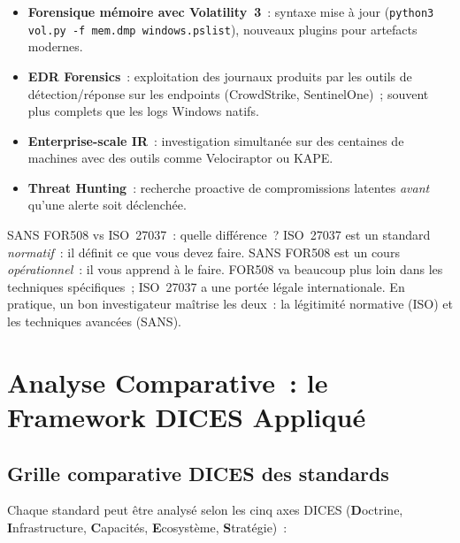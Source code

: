 \begin{itemize}
    \item \textbf{Forensique mémoire avec Volatility~3}~: syntaxe mise à
          jour (\texttt{python3 vol.py -f mem.dmp windows.pslist}),
          nouveaux plugins pour artefacts modernes.
    \item \textbf{EDR Forensics}~: exploitation des journaux produits par les
          outils de détection/réponse sur les endpoints (CrowdStrike, SentinelOne)~;
          souvent plus complets que les logs Windows natifs.
    \item \textbf{Enterprise-scale IR}~: investigation simultanée sur
          des centaines de machines avec des outils comme Velociraptor ou KAPE.
    \item \textbf{Threat Hunting}~: recherche proactive de compromissions
          latentes \emph{avant} qu'une alerte soit déclenchée.
\end{itemize}

\begin{boiteRemarque}{SANS FOR508 vs ISO~27037~: quelle différence~?}
ISO~27037 est un standard \emph{normatif}~: il définit ce que vous devez faire.
SANS FOR508 est un cours \emph{opérationnel}~: il vous apprend à le faire.
FOR508 va beaucoup plus loin dans les techniques spécifiques~; ISO~27037 a
une portée légale internationale. En pratique, un bon investigateur maîtrise
les deux~: la légitimité normative (ISO) et les techniques avancées (SANS).
\end{boiteRemarque}

\section{Analyse Comparative~: le Framework DICES Appliqué}
\label{sec:comparaison-dices}

\subsection{Grille comparative DICES des standards}

Chaque standard peut être analysé selon les cinq axes DICES
(\textbf{D}octrine, \textbf{I}nfrastructure, \textbf{C}apacités,
\textbf{E}cosystème, \textbf{S}tratégie)~:

